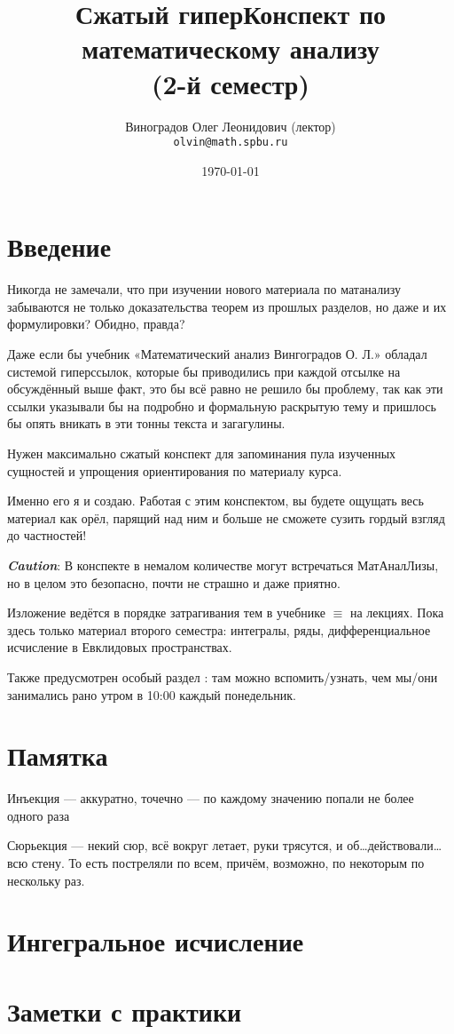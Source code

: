 \documentclass[12pt, a4paper]{article}
\title{Сжатый гиперКонспект по математическому анализу \\(2-й семестр)}
\author{
  \vova
  \and
  Виноградов Олег Леонидович (лектор)\\
  \texttt{olvin@math.spbu.ru}
}
\date{\today}
\begin{document}
  \maketitle
  \newpage
  \tableofcontents
  \newpage


  \section{Введение}

  Никогда не замечали, что при изучении нового материала по матанализу забываются не только доказательства теорем из прошлых разделов, но даже и их формулировки?
  Обидно, правда?

  Даже если бы учебник «Математический анализ Вингоградов О. Л.» обладал системой гиперссылок, которые бы приводились при каждой отсылке на обсуждённый выше факт, 
  это бы всё равно не решило бы проблему, так как эти ссылки указывали бы на подробно и формальную раскрытую тему и пришлось бы опять вникать в эти тонны текста и загагулины.

  Нужен максимально сжатый конспект для запоминания пула изученных сущностей и упрощения ориентирования по материалу курса.
  
  Именно его я и создаю.
  Работая с этим конспектом, вы будете ощущать весь материал как орёл, парящий над ним и больше не сможете сузить гордый взгляд до частностей!

  \textit{\textbf{Caution}}: В конспекте в немалом количестве могут встречаться МатАналЛизы, но в целом это безопасно, почти не страшно и даже приятно.

  Изложение ведётся в порядке затрагивания тем в учебнике $\equiv$ на лекциях.
  Пока здесь только материал второго семестра: интегралы, ряды, дифференциальное исчисление в Евклидовых пространствах.

  Также предусмотрен особый раздел : там можно вспомить/узнать, чем мы/они занимались рано утром в 10:00 каждый понедельник.


  \section{Памятка}

  Инъекция — аккуратно, точечно — по каждому значению попали не более одного раза
  
  Сюрьекция — некий сюр, всё вокруг летает, руки трясутся, и об…действовали… всю стену. 
  То есть постреляли по всем, причём, возможно, по некоторым по нескольку раз.

  \section{Ингегральное исчисление}

  


  
  \section{Заметки с практики}\label{practice-notes}
\end{document}
